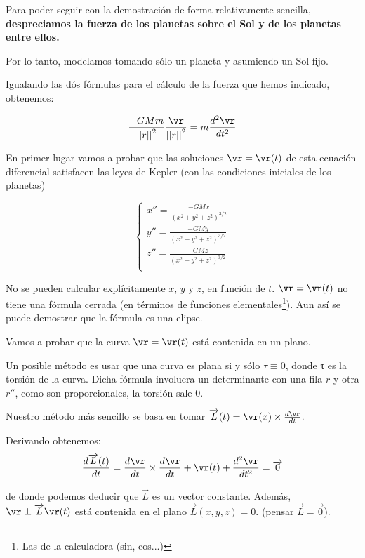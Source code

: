 Para poder seguir con la demostración de forma relativamente sencilla, \textbf{despreciamos la fuerza de los planetas sobre el Sol y de los planetas entre ellos.}

Por lo tanto, modelamos tomando sólo un planeta y asumiendo un Sol fijo.

Igualando las dós fórmulas para el cálculo de la fuerza que hemos indicado, obtenemos:

$$ \frac{-GMm}{{||r||}^2} \frac{\vr}{{||r||}^2}  =  m \frac{d^2\vr}{d t^2}$$


En primer lugar vamos a probar que las soluciones $\vr = \vr(t)$ de esta ecuación diferencial satisfacen las leyes de Kepler (con las condiciones iniciales de los planetas)

$$
\begin{cases}
 x'' = \frac{-GMx}{(x^2 + y^2 + z^2)^{3/2}}\\
 y'' = \frac{-GMy}{(x^2 + y^2 + z^2)^{3/2}}\\
 z'' = \frac{-GMz}{(x^2 + y^2 + z^2)^{3/2}}\\
\end{cases}
$$


 \begin{obs}
 No se pueden calcular explícitamente $x$, $y$ y $z$, en función de $t$. $\vr = \vr(t)$ no tiene una fórmula cerrada (en términos de funciones elementales\footnote{Las de la calculadora (sin, cos...)}). Aun así se puede demostrar que la fórmula es una elipse.
 \end{obs}


Vamos a probar que la curva $\vr = \vr(t)$ está contenida en un plano.

Un posible método es usar que una curva es plana si y sólo $τ \equiv 0$, donde τ es la torsión de la curva. Dicha fórmula involucra un determinante con una fila $r$ y otra $r''$, como son proporcionales, la torsión sale 0.


Nuestro método más sencillo se basa en tomar $\overrightarrow{L}(t) = \vr(x) \times \frac{d\vr}{dt}$.

Derivando obtenemos:
$$\frac{d\overrightarrow{L}(t)}{dt} = \frac{d\vr}{dt} \times \frac{d\vr}{dt} + \vr(t) + \frac{d^2\vr}{dt^2} = \overrightarrow{0}$$

de donde podemos deducir que $\overrightarrow{L}$ es un vector constante. Además, $\vr \perp \overrightarrow{L} \vr(t)$ está contenida en el plano $\overrightarrow{L}(x,y,z) = 0 $.
(pensar $\overrightarrow{L} = \overrightarrow{0}$).

